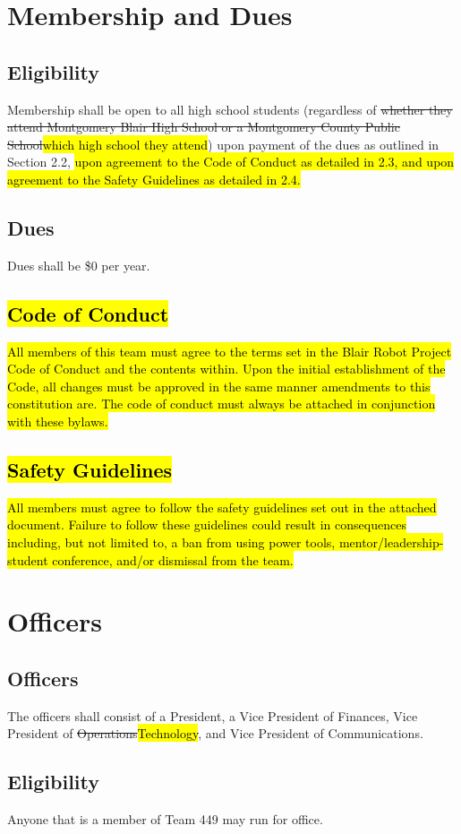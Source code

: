 \documentclass[12pt, a4paper]{article}
\begin{document}
\section{Membership and Dues}
\subsection{Eligibility}
Membership shall be open to all high school students (regardless of \st{whether they attend Montgomery Blair High School or a Montgomery County Public School}\hl{which high school they attend}) upon payment of the dues as outlined in Section 2.2, \hl{upon agreement to the Code of Conduct as detailed in 2.3, and upon agreement to the Safety Guidelines as detailed in 2.4.}
\subsection{Dues}
Dues shall be \$0 per year.
\subsection{\hl{Code of Conduct}}
\hl{All members of this team must agree to the terms set in the Blair Robot Project Code of Conduct and the contents within. 
Upon the initial establishment of the Code, all changes must be approved in the same manner amendments to this constitution are. 
The code of conduct must always be attached in conjunction with these bylaws.}
\subsection{\hl{Safety Guidelines}}
\hl{
All members must agree to follow the safety guidelines set out in the attached document. Failure to follow these guidelines could result in consequences including, but not limited to, a ban from using power tools, mentor/leadership-student conference, and/or dismissal from the team.
}

\section{Officers}
\subsection{Officers}
The officers shall consist of a President, a Vice President of Finances, Vice President of \st{Operations}\hl{Technology}, and Vice President of Communications.
\subsection{Eligibility}
Anyone that is a member of Team 449 may run for office.  
\end{document}

